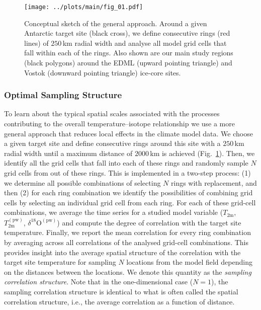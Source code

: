 \documentclass[draft]{agujournal2019}
\begin{document}
\begin{figure}[t]%
\centering
\texttt{[image: ../plots/main/fig\_01.pdf]}
\caption[Conceptual approach]{%
  Conceptual sketch of the general approach. Around a given Antarctic target
  site (black cross), we define consecutive rings (red lines) of $250$\,km
  radial width and analyse all model grid cells that fall within each of the
  rings. Also shown are our main study regions (black polygons) around the EDML
  (upward pointing triangle) and Vostok (downward pointing triangle) ice-core
  sites.}
\label{fig:concept}%
\end{figure}%

\subsubsection{Optimal Sampling Structure}\label{methods:opt.sampling}

To learn about the typical spatial scales associated with the processes
contributing to the overall temperature--isotope relationship we use a more
general approach that reduces local effects in the climate model data. We choose
a given target site and define consecutive rings around this site with a
$250$\,km radial width until a maximum distance of $2000$\,km is achieved
(Fig.~\ref{fig:concept}). Then, we identify all the grid cells that fall into
each of these rings and randomly sample $N$ grid cells from out of these
rings. This is implemented in a two-step process: (1) we determine all possible
combinations of selecting $N$ rings with replacement, and then (2) for each
ring combination we identify the possibilities of combining grid cells by
selecting an individual grid cell from each ring. For each of these grid-cell
combinations, we average the time series for a studied model variable
($T_{2\mathrm{m}}$, $T_{2\mathrm{m}}^{\mathrm{(pw)}}$,
$\delta^{18}\mathrm{O}^{\mathrm{(pw)}}$) and compute the degree of correlation
with the target site temperature. Finally, we report the mean correlation for
every ring combination by averaging across all correlations of the analysed
grid-cell combinations. This provides insight into the average spatial structure
of the correlation with the target site temperature for sampling $N$ locations
from the model field depending on the distances between the locations. We denote
this quantity as the \emph{sampling correlation structure}. Note that in the
one-dimensional case ($N=1$), the sampling correlation structure is identical to
what is often called the spatial correlation structure, i.e., the average
correlation as a function of distance.
\end{document}
